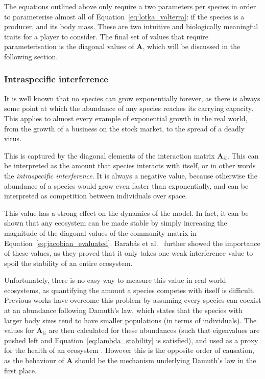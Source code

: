 The equations outlined above only require a two parameters per species in order to parameterise almost all of Equation~\eqref{eq:lotka_volterra}: if the species is a producer, and its body mass. These are two intuitive and biologically meaningful traits for a player to consider.
The final set of values that require parameterisation is the diagonal values of $\mathbf{A}$, which will be discussed in the following section.

\subsubsection{Intraspecific interference}
It is well known that no species can grow exponentially forever, as there is always some point at which the abundance of any species reaches its carrying capacity. 
This applies to almost every example of exponential growth in the real world, from the growth of a business on the stock market, to the spread of a deadly virus.

This is captured by the diagonal elements of the interaction matrix $\mathbf{A}_{ii}$. This can be interpreted as the amount that species interacts with itself, or in other words the \emph{intraspecific interference}. It is always a negative value, because otherwise the abundance of a species would grow even faster than exponentially, and can be interpreted as competition between individuals over space.

This value has a strong effect on the dynamics of the model. In fact, it can be shown that any ecosystem can be made stable by simply increasing the magnitude of the diagonal values of the community matrix in Equation~\eqref{eq:jacobian_evaluated}. 
Barab\'as et al.\ \cite{Barabas2017} further showed the importance of these values, as they proved that it only takes one weak interference value to spoil the stability of an entire ecosystem.

Unfortunately, there is no easy way to measure this value in real world ecosystems, as quantifying the amount a species competes with itself is difficult. Previous works have overcome this problem by assuming every species can coexist at an abundance following Damuth's law, which states that the species with larger body sizes tend to have smaller populations (in terms of individuals). The values for $\mathbf{A}_{ii}$ are then calculated for these abundances (such that eigenvalues are pushed left and Equation~\eqref{eq:lambda_stability} is satisfied), and used as a proxy for the health of an ecosystem \cite{Tang2014Correlation, Pawar2015}. However this is the opposite order of causation, as the behaviour of $\mathbf{A}$ should be the mechanism underlying Damuth's law in the first place.

